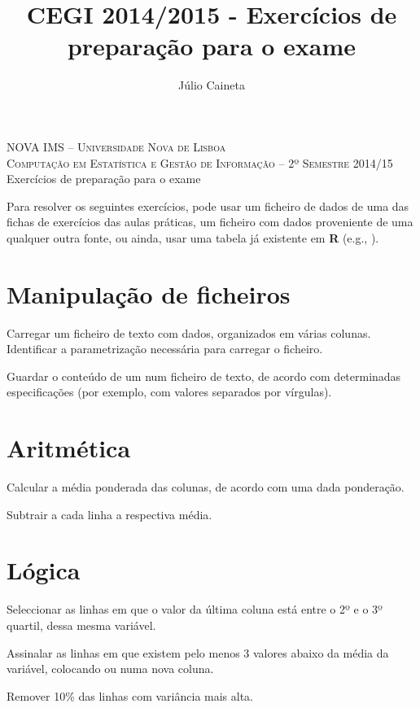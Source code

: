\documentclass{exam}
\author{Júlio Caineta}
\title{CEGI 2014/2015 - Exercícios de preparação para o exame}
\begin{document}
 
\begin{center}
\textsc {\small NOVA IMS -- Universidade Nova de Lisboa} \\
\textsc {Computação em Estatística e Gestão de Informação -- 2º Semestre 2014/15}
\vspace{5mm} \\
{\large Exercícios de preparação para o exame}
\end{center}
 
\vspace{5mm}

Para resolver os seguintes exercícios, pode usar um ficheiro de dados de uma das fichas de exercícios das aulas práticas, um ficheiro com dados proveniente de uma qualquer outra fonte, ou ainda, usar uma tabela já existente em \textbf{R} (e.g., ).

\section*{Manipulação de ficheiros}

\begin{questions}
	\question Carregar um ficheiro de texto com dados, organizados em várias colunas. Identificar a parametrização necessária para carregar o ficheiro.

	\question Guardar o conteúdo de um  num ficheiro de texto, de acordo com determinadas especificações (por exemplo, com valores separados por vírgulas).

\end{questions}

\section*{Aritmética}

\begin{questions}
	\question Calcular a média ponderada das colunas, de acordo com uma dada ponderação.
	
	\question Subtrair a cada linha a respectiva média.
\end{questions}

\section*{Lógica}

\begin{questions}
	\question Seleccionar as linhas em que o valor da última coluna está entre o 2º e o 3º quartil, dessa mesma variável.
	
	\question Assinalar as linhas em que existem pelo menos 3 valores abaixo da média da variável, colocando  ou  numa nova coluna.
	
	\question Remover 10\% das linhas com variância mais alta.
\end{questions}
\end{document}
